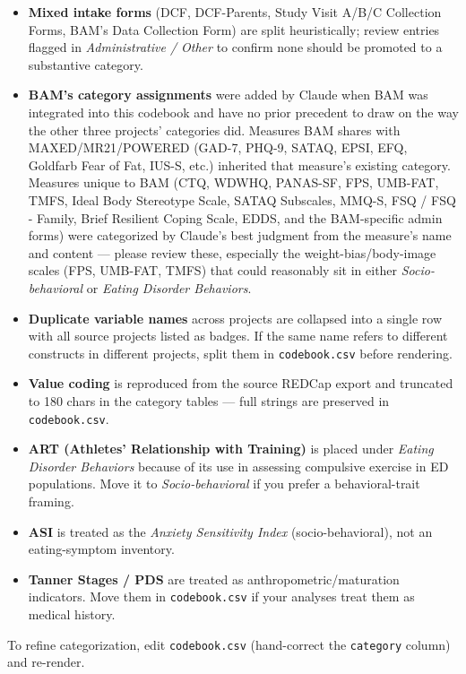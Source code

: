 \documentclass[
]{book}
\newcounter{none} %
\providecommand{\tightlist}{%
  \setlength{\itemsep}{0pt}\setlength{\parskip}{0pt}}
\begin{document}
\begin{itemize}
\tightlist
\item
  \textbf{Mixed intake forms} (DCF, DCF-Parents, Study Visit A/B/C Collection Forms, BAM's Data Collection Form) are split heuristically; review entries flagged in \emph{Administrative / Other} to confirm none should be promoted to a substantive category.
\item
  \textbf{BAM's category assignments} were added by Claude when BAM was integrated into this codebook and have no prior precedent to draw on the way the other three projects' categories did. Measures BAM shares with MAXED/MR21/POWERED (GAD-7, PHQ-9, SATAQ, EPSI, EFQ, Goldfarb Fear of Fat, IUS-S, etc.) inherited that measure's existing category. Measures unique to BAM (CTQ, WDWHQ, PANAS-SF, FPS, UMB-FAT, TMFS, Ideal Body Stereotype Scale, SATAQ Subscales, MMQ-S, FSQ / FSQ - Family, Brief Resilient Coping Scale, EDDS, and the BAM-specific admin forms) were categorized by Claude's best judgment from the measure's name and content --- please review these, especially the weight-bias/body-image scales (FPS, UMB-FAT, TMFS) that could reasonably sit in either \emph{Socio-behavioral} or \emph{Eating Disorder Behaviors}.
\item
  \textbf{Duplicate variable names} across projects are collapsed into a single row with all source projects listed as badges. If the same name refers to different constructs in different projects, split them in \texttt{codebook.csv} before rendering.
\item
  \textbf{Value coding} is reproduced from the source REDCap export and truncated to 180 chars in the category tables --- full strings are preserved in \texttt{codebook.csv}.
\item
  \textbf{ART (Athletes' Relationship with Training)} is placed under \emph{Eating Disorder Behaviors} because of its use in assessing compulsive exercise in ED populations. Move it to \emph{Socio-behavioral} if you prefer a behavioral-trait framing.
\item
  \textbf{ASI} is treated as the \emph{Anxiety Sensitivity Index} (socio-behavioral), not an eating-symptom inventory.
\item
  \textbf{Tanner Stages / PDS} are treated as anthropometric/maturation indicators. Move them in \texttt{codebook.csv} if your analyses treat them as medical history.
\end{itemize}

To refine categorization, edit \texttt{codebook.csv} (hand-correct the \texttt{category} column) and re-render.


\end{document}
